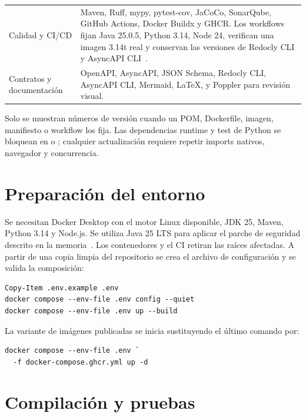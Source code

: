 \begin{longtable}{p{}p{}}
	Calidad y CI/CD           & Maven, Ruff, mypy, pytest-cov, JaCoCo, SonarQube, GitHub Actions, Docker Buildx y GHCR. Los workflows fijan Java 25.0.5, Python 3.14, Node 24, verifican una imagen 3.14t real y conservan las versiones de Redocly CLI y AsyncAPI CLI~\cite{github-actions,ghcr,sonarqube}.                                                                                              \\
	Contratos y documentación & OpenAPI, AsyncAPI, JSON Schema, Redocly CLI, AsyncAPI CLI, Mermaid, \LaTeX{}, \ruta{latexmk} y Poppler para revisión visual.                                                                                                                                                                                                                                              \\
	\bottomrule
\end{longtable}

Solo se muestran números de versión cuando un POM, Dockerfile, imagen, manifiesto o workflow los fija. Las dependencias runtime y test de Python se bloquean en  o ; cualquier actualización requiere repetir imports nativos, navegador y concurrencia.

\section{Preparación del entorno}

Se necesitan Docker Desktop con el motor Linux disponible, JDK 25, Maven, Python 3.14 y Node.js. Se utiliza Java 25 LTS para aplicar el parche de seguridad descrito en la memoria~\cite{oracle-cve-2026-91403,oracle-emudhra-mitigation}. Los contenedores y el CI retiran las raíces afectadas. A partir de una copia limpia del repositorio se crea el archivo de configuración y se valida la composición:

\begin{verbatim}
Copy-Item .env.example .env
docker compose --env-file .env config --quiet
docker compose --env-file .env up --build
\end{verbatim}

La variante de imágenes publicadas se inicia sustituyendo el último comando por:

\begin{verbatim}
docker compose --env-file .env `
  -f docker-compose.ghcr.yml up -d
\end{verbatim}

\section{Compilación y pruebas}

